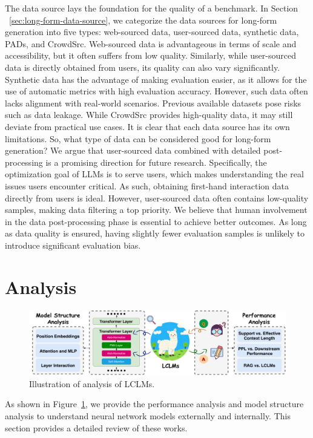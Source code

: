 \documentclass[11pt, a4paper, logo, copyright, nonumbering]{map}
\begin{document}
The data source lays the foundation for the quality of a benchmark. In Section ~\ref{sec:long-form-data-source}, we categorize the data sources for long-form generation into five types: web-sourced data, user-sourced data, synthetic data, PADs, and CrowdSrc. Web-sourced data is advantageous in terms of scale and accessibility, but it often suffers from low quality. Similarly, while user-sourced data is directly obtained from users, its quality can also vary significantly. Synthetic data has the advantage of making evaluation easier, as it allows for the use of automatic metrics with high evaluation accuracy. However, such data often lacks alignment with real-world scenarios. Previous available datasets pose risks such as data leakage. While CrowdSrc provides high-quality data, it may still deviate from practical use cases. It is clear that each data source has its own limitations. So, what type of data can be considered good for long-form generation? We argue that user-sourced data combined with detailed post-processing is a promising direction for future research. Specifically, the optimization goal of LLMs is to serve users, which makes understanding the real issues users encounter critical. As such, obtaining first-hand interaction data directly from users is ideal. However, user-sourced data often contains low-quality samples, making data filtering a top priority. We believe that human involvement in the data post-processing phase is essential to achieve better outcomes. As long as data quality is ensured, having slightly fewer evaluation samples is unlikely to introduce significant evaluation bias. 

\section{Analysis} 
\label{sec:analysis}

\begin{figure}[!htp]
    \centering
    \includegraphics[width=1.0\linewidth]{graphs/analysis.pdf}
    \caption{Illustration of analysis of LCLMs.}
    \label{fig:analysis}
\end{figure}
As shown in Figure~\ref{fig:analysis},
we provide the 
performance analysis and 
model structure analysis to understand neural network models externally and internally. 
This section provides a detailed review of these works.
\end{document}
